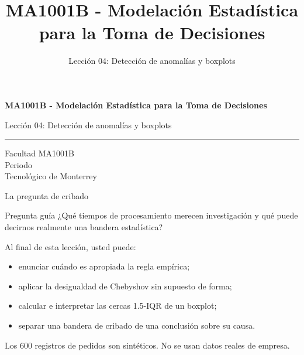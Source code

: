 \documentclass[aspectratio=169,10pt,spanish]{beamer}
\title{MA1001B - Modelación Estadística para la Toma de Decisiones}
\subtitle{Lección 04: Detección de anomalías y boxplots}
\author{}
\institute{Tecnol\'ogico de Monterrey}
\date{}
\begin{document}
\begin{frame}[plain]
  \vspace{1.2cm}
  {\Large\bfseries MA1001B - Modelación Estadística para la Toma de Decisiones\par}
  \vspace{0.7cm}
  {\large Lección 04: Detección de anomalías y boxplots\par}
  \vspace{0.7cm}
  {\color{TecRojo}\rule{\textwidth}{1.2pt}}
  \vspace{0.8cm}

  Facultad MA1001B\\[0.3cm]
  Periodo\\[0.3cm]
  Tecnol\'ogico de Monterrey
\end{frame}

\begin{frame}{La pregunta de cribado}
  \begin{alertblock}{Pregunta guía}
    ¿Qué tiempos de procesamiento merecen investigación y qué puede decirnos
    realmente una bandera estadística?
  \end{alertblock}

  \vspace{0.5em}
  Al final de esta lección, usted puede:
  \begin{itemize}
    \item enunciar cuándo es apropiada la regla empírica;
    \item aplicar la desigualdad de Chebyshov sin supuesto de forma;
    \item calcular e interpretar las cercas 1.5-IQR de un boxplot;
    \item separar una bandera de cribado de una conclusión sobre su causa.
  \end{itemize}

  \vfill
  \scriptsize Los 600 registros de pedidos son sintéticos. No se usan datos reales de empresa.
\end{frame}
\end{document}

